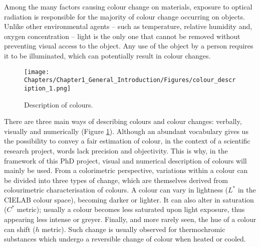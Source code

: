 Among the many factors causing colour change on materials, exposure to optical radiation is responsible for the majority of colour change occurring on objects. Unlike other environmental agents – such as temperature, relative humidity and, oxygen concentration – light is the only one that cannot be removed without preventing visual access to the object. Any use of the object by a person requires it to be illuminated, which can potentially result in colour changes. \\


\begin{figure}[!h]
\centering
\texttt{[image: Chapters/Chapter1\_General\_Introduction/Figures/colour\_description\_1.png]}
\caption[\hspace{0.3cm}Description of colours]{Description of colours.}
\label{fig:colours_description}
\end{figure}


There are three main ways of describing colours and colour changes: verbally, visually and numerically (Figure \ref{fig:colours_description}). Although an abundant vocabulary gives us the possibility to convey a fair estimation of colour, in the context of a scientific research project, words lack precision and objectivity. This is why, in the framework of this PhD project, visual and numerical description of colours will mainly be used. From a colorimetric perspective, variations within a colour can be divided into three types of change, which are themselves derived from colourimetric characterisation of colours. A colour can vary in lightness ($L^*$  in the CIELAB colour space), becoming darker or lighter. It can also alter in saturation ($C^*$ metric); usually a colour becomes less saturated upon light exposure, thus appearing less intense or greyer. Finally, and more rarely seen, the hue of a colour can shift ($h$ metric). Such change is usually observed for thermochromic substances which undergo a reversible change of colour when heated or cooled. \\


